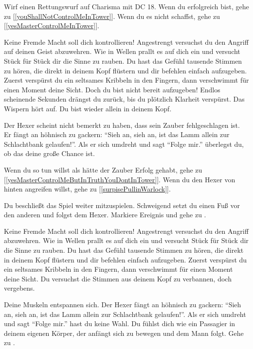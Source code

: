 Wirf einen Rettungswurf auf Charisma mit DC 18. Wenn du erfolgreich bist, gehe zu [\ref{youShallNotControlMeInTower}]. Wenn du es nicht schaffst, gehe zu [\ref{yesMasterControlMeInTower}].


Keine Fremde Macht soll dich kontrollieren! Angestrengt versuchst du den Angriff auf deinen Geist abzuwehren. Wie in Wellen prallt es auf dich ein und versucht Stück für Stück dir die Sinne zu rauben. Du hast das Gefühl tausende Stimmen zu hören, die direkt in deinem Kopf flüstern und dir befehlen einfach aufzugeben. Zuerst verspürst du ein seltsames Kribbeln in den Fingern, dann verschwimmt für einen Moment deine Sicht. Doch du bist nicht bereit aufzugeben! Endlos scheinende Sekunden drängst du zurück, bis du plötzlich Klarheit verspürst. Das Wispern hört auf. Du bist wieder allein in deinem Kopf.

Der Hexer scheint nicht bemerkt zu haben, dass sein Zauber fehlgeschlagen ist.
Er fängt an höhnisch zu gackern: ``Sieh an, sieh an, ist das Lamm allein zur Schlachtbank gelaufen!''.
Als er sich umdreht und sagt ``Folge mir.'' überlegst du, ob das deine große Chance ist.

Wenn du so tun willst als hätte der Zauber Erfolg gehabt, gehe zu [\ref{yesMasterControlMeButInTruthYouDontInTower}].
Wenn du den Hexer von hinten angreifen willst, gehe zu [\ref{surpisePullinWarlock}].


Du beschließt das Spiel weiter mitzuspielen. Schweigend setzt du einen Fuß vor den anderen und folgst dem Hexer.
Markiere Ereignis  und gehe zu .


Keine Fremde Macht soll dich kontrollieren! Angestrengt versuchst du den Angriff abzuwehren. Wie in Wellen prallt es auf dich ein und versucht Stück für Stück dir die Sinne zu rauben. Du hast das Gefühl tausende Stimmen zu hören, die direkt in deinem Kopf flüstern und dir befehlen einfach aufzugeben. Zuerst verspürst du ein seltsames Kribbeln in den Fingern, dann verschwimmt für einen Moment deine Sicht. Du versuchst die Stimmen aus deinem Kopf zu verbannen, doch vergebens.

Deine Muskeln entspannen sich. Der Hexer fängt an höhnisch zu gackern: ``Sieh an, sieh an, ist das Lamm allein zur Schlachtbank gelaufen!''.
Als er sich umdreht und sagt ``Folge mir.'' hast du keine Wahl. Du fühlst dich wie ein Passagier in deinem eigenen Körper, der anfängt sich zu bewegen und dem Mann folgt.
Gehe zu .

